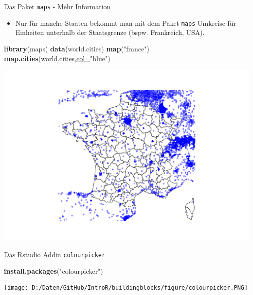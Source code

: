 \documentclass[ignorenonframetext,]{beamer}
\newenvironment{Shaded}{\begin{snugshade}}{\end{snugshade}}
\newcommand{\KeywordTok}[1]{\textcolor[rgb]{0.26,0.66,0.93}{\textbf{#1}}}
\newcommand{\DataTypeTok}[1]{\textcolor[rgb]{0.74,0.68,0.62}{\underline{#1}}}
\newcommand{\StringTok}[1]{\textcolor[rgb]{0.02,0.61,0.04}{#1}}
\newcommand{\NormalTok}[1]{\textcolor[rgb]{0.74,0.68,0.62}{#1}}
\providecommand{\tightlist}{%
  \setlength{\itemsep}{0pt}\setlength{\parskip}{0pt}}
\begin{document}
\begin{frame}[fragile]{Das Paket \texttt{maps} - Mehr Information}

\begin{itemize}
\tightlist
\item
  Nur für manche Staaten bekommt man mit dem Paket \texttt{maps}
  Umkreise für Einheiten unterhalb der Staatsgrenze (bspw. Frankreich,
  USA).
\end{itemize}

\begin{Shaded}
\begin{Highlighting}[]
\KeywordTok{library}\NormalTok{(maps)}
\KeywordTok{data}\NormalTok{(world.cities)}
\KeywordTok{map}\NormalTok{(}\StringTok{"france"}\NormalTok{)}
\KeywordTok{map.cities}\NormalTok{(world.cities,}\DataTypeTok{col=}\StringTok{"blue"}\NormalTok{)}
\end{Highlighting}
\end{Shaded}

\includegraphics{Geomedizin_files/figure-beamer/unnamed-chunk-119-1.pdf}

\end{frame}

\begin{frame}[fragile]{Das Rstudio Addin \texttt{colourpicker}}

\begin{Shaded}
\begin{Highlighting}[]
\KeywordTok{install.packages}\NormalTok{(}\StringTok{"colourpicker"}\NormalTok{)}
\end{Highlighting}
\end{Shaded}

\texttt{[image: D:/Daten/GitHub/IntroR/buildingblocks/figure/colourpicker.PNG]}

\end{frame}
\end{document}
